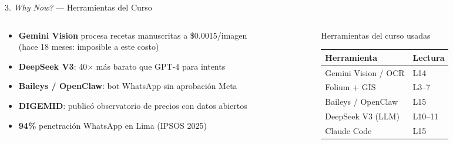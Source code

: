 \documentclass[aspectratio=169,11pt]{beamer}
\begin{document}
\begin{frame}{3. \textit{Why Now?} --- Herramientas del Curso}

\begin{columns}[T]
\begin{column}{0.5\textwidth}
\begin{itemize}
  \item \textbf{Gemini Vision} procesa recetas manuscritas a \$0.0015/imagen\\
        (hace 18 meses: imposible a este costo)
  \item \textbf{DeepSeek V3}: 40$\times$ m\'as barato que GPT-4 para intents
  \item \textbf{Baileys / OpenClaw}: bot WhatsApp sin aprobaci\'on Meta
  \item \textbf{DIGEMID}: public\'o observatorio de precios con datos abiertos
  \item \textbf{94\%} penetraci\'on WhatsApp en Lima (IPSOS 2025)
\end{itemize}
\end{column}
\begin{column}{0.46\textwidth}
\begin{block}{Herramientas del curso usadas}
\small
\begin{tabular}{ll}
\toprule
\textbf{Herramienta} & \textbf{Lectura} \\
\midrule
Gemini Vision / OCR & L14 \\
Folium + GIS & L3--7 \\
Baileys / OpenClaw & L15 \\
DeepSeek V3 (LLM) & L10--11 \\
Claude Code & L15 \\
\bottomrule
\end{tabular}
\end{block}
\end{column}
\end{columns}
\end{frame}
\end{document}
